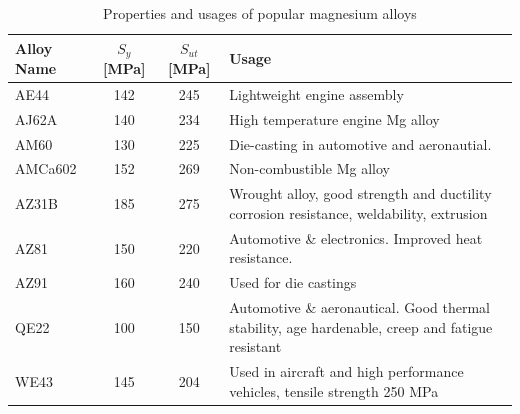 \documentclass[
10pt,
a4paper,
openany,
svgnames,
]{book}
\begin{document}
\begin{table}[H]
  \centering
  \caption{Properties and usages of popular magnesium alloys}
  \label{tab: mag alloy props and uses}
  {\renewcommand{\arraystretch}{1.4}
  \begin{tabular}{lccL{7cm}}
    \toprule
    Alloy Name & $S_y$ [MPa] & $S_{ut}$ [MPa] &  Usage \\
    \midrule
    AE44       & 142 & 245    & Lightweight engine assembly \\
    AJ62A      & 140 & 234    & High temperature engine Mg alloy                                                             \\
    AM60       & 130 & 225    & Die-casting in automotive and aeronautial.                                                                                            \\
    AMCa602    & 152 & 269    & Non-combustible Mg alloy                                                                     \\
    AZ31B      & 185 & 275    & Wrought alloy, good strength and ductility corrosion resistance, weldability, extrusion      \\
    AZ81       & 150 & 220    & Automotive \& electronics. Improved heat resistance.                                          \\
    AZ91    & 160 & 240 & Used for die castings                                                                        \\
    QE22    & 100 & 150  & Automotive \& aeronautical. Good thermal stability, age hardenable, creep and fatigue resistant \\
    WE43    & 145  & 204 & Used in aircraft and high performance vehicles, tensile strength 250 MPa              \\
    \bottomrule                     
  \end{tabular}}
\end{table}
\end{document}
